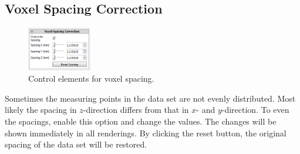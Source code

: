 \subsection{Voxel Spacing Correction}\label{ultramicroscopy.section.voxelspacing}
\begin{minipage}{\textwidth}
\begin{figure}
\vspace*{-1cm}
\centering
\includegraphics[width=0.25\textwidth]{images/voxel_spacing.png}
\caption{Control elements for voxel spacing.}
\label{ultramicroscopy.figure.voxelspacing}
\end{figure}
Sometimes the measuring points in the data set are not evenly distributed. 
Most likely the spacing in $z$-direction differs from that in $x$- and $y$-direction. 
To even the spacings, enable this option and change the values. 
The changes will be shown immediately in all renderings. 
By clicking the reset button, the original spacing of the data set will be restored.
\end{minipage}

